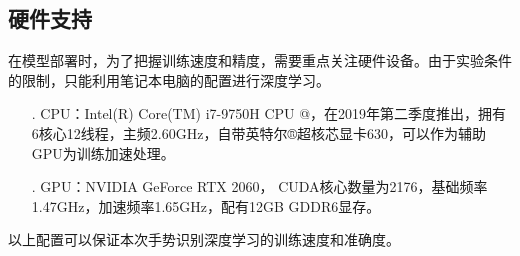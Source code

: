 \documentclass[a4paper]{article}
\begin{document}
  \subsection{硬件支持}
  在模型部署时，为了把握训练速度和精度，需要重点关注硬件设备。由于实验条件的限制，只能利用笔记本电脑的配置进行深度学习。
              \begin{enumerate}
                \item[.] CPU：Intel(R) Core(TM) i7-9750H CPU @，在2019年第二季度推出，拥有6核心12线程，主频2.60GHz，自带英特尔®超核芯显卡630，可以作为辅助GPU为训练加速处理。
                \item[.] GPU：NVIDIA GeForce RTX 2060， CUDA核心数量为2176，基础频率1.47GHz，加速频率1.65GHz，配有12GB GDDR6显存。
                \end{enumerate}
                以上配置可以保证本次手势识别深度学习的训练速度和准确度。
\end{document}
